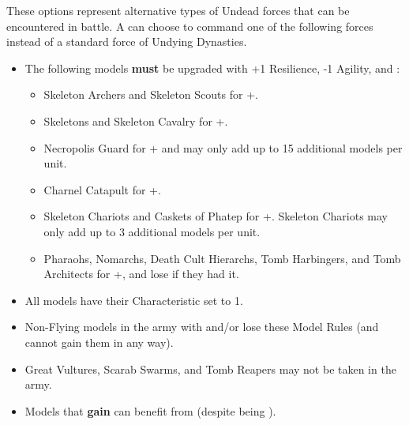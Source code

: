

These options represent alternative types of Undead forces that can be encountered in battle. A \pharaoh{} can choose to command one of the following forces instead of a standard force of Undying Dynasties.

\subtitle{\commanderoftheterracottaarmy}

\begin{itemize}[label={-}]
\item The following models \textbf{must} be upgraded with +1 Resilience, -1 Agility, and \textbf{\ensouledstatue}:

\begin{itemize}[label={$\bullet$}]
\item Skeleton Archers and Skeleton Scouts for +\permodel{}.
\item Skeletons and Skeleton Cavalry for +\permodel{}.
\item Necropolis Guard for +\permodel{} and may only add up to 15 additional models per unit.
\item Charnel Catapult for +\permodel{}.
\item Skeleton Chariots and Caskets of Phatep for +\permodel{}. Skeleton Chariots may only add up to 3 additional models per unit.
\item Pharaohs, Nomarchs, Death Cult Hierarchs, Tomb Harbingers, and Tomb Architects for +\permodel{}, and lose \flammable{} if they had it.
\end{itemize}

\item All models have their \resurrected{} Characteristic set to 1.

\item Non-Flying models in the army with \undergroundambush{} and/or \lighttroops{} lose these Model Rules (and cannot gain them in any way). 

\item Great Vultures, Scarab Swarms, and Tomb Reapers may not be taken in the army.

\item Models that \textbf{gain} \ensouledstatue{} can benefit from \undyingwill{} (despite being \ensouledstatue{}).
\end{itemize}

\subtitle{\lordofthebarrowlegion}

